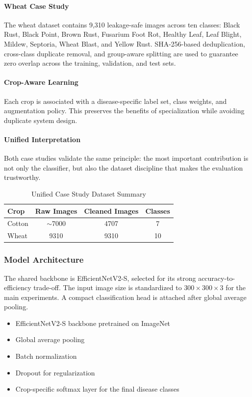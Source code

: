 \documentclass[conference]{IEEEtran}
\begin{document}
\paragraph{Wheat Case Study}
The wheat dataset contains 9,310 leakage-safe images across ten classes: Black Rust, Black Point, Brown Rust, Fusarium Foot Rot, Healthy Leaf, Leaf Blight, Mildew, Septoria, Wheat Blast, and Yellow Rust. SHA-256-based deduplication, cross-class duplicate removal, and group-aware splitting are used to guarantee zero overlap across the training, validation, and test sets.

\paragraph{Crop-Aware Learning}
Each crop is associated with a disease-specific label set, class weights, and augmentation policy. This preserves the benefits of specialization while avoiding duplicate system design.

\paragraph{Unified Interpretation}
Both case studies validate the same principle: the most important contribution is not only the classifier, but also the dataset discipline that makes the evaluation trustworthy.

\begin{table}[t]
\centering
\caption{Unified Case Study Dataset Summary}
\label{tab:dataset-summary}
\begin{tabular}{lccc}
\hline
Crop & Raw Images & Cleaned Images & Classes \\
\hline
Cotton & $\sim$7000 & 4707 & 7 \\
Wheat & 9310 & 9310 & 10 \\
\hline
\end{tabular}
\end{table}

\subsubsection{Model Architecture}
The shared backbone is EfficientNetV2-S, selected for its strong accuracy-to-efficiency trade-off. The input image size is standardized to $300 \times 300 \times 3$ for the main experiments. A compact classification head is attached after global average pooling.

\begin{itemize}
\item EfficientNetV2-S backbone pretrained on ImageNet
\item Global average pooling
\item Batch normalization
\item Dropout for regularization
\item Crop-specific softmax layer for the final disease classes
\end{itemize}
\end{document}

